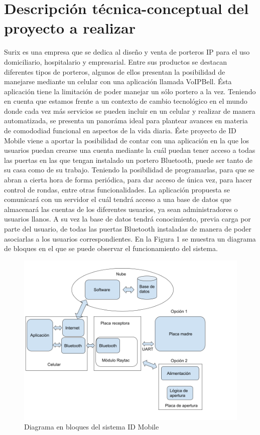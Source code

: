 \documentclass[11pt]{charter}
\begin{document}
\section{Descripción técnica-conceptual del proyecto a realizar}
\label{sec:descripcion}

Surix es una empresa que se dedica al diseño y venta de porteros IP para el uso domiciliario, hospitalario y empresarial. 
Entre sus productos se destacan diferentes tipos de porteros, algunos de ellos presentan la posibilidad de manejarse mediante un celular con una aplicación llamada VoIPBell. Ésta aplicación tiene la limitación de poder manejar un sólo portero a la vez. \newline
Teniendo en cuenta que estamos frente a un contexto de cambio tecnológico en el mundo donde cada vez más servicios se pueden incluir en un celular y realizar de manera automatizada, se presenta un panoráma ideal para plantear avances en materia de comododiad funcional en aspectos de la vida diaria. \newline
Éste proyecto de ID Mobile viene a aportar la posibilidad de contar con una aplicación en la que los usuarios puedan crearse una cuenta mediante la cuál puedan tener acceso a todas las puertas en las que tengan instalado un portero Bluetooth, puede ser tanto de su casa como de su trabajo. Teniendo la posibilidad de programarlas, para que se abran a cierta hora de forma periódica, para dar acceso de única vez, para hacer control de rondas, entre otras funcionalidades. La aplicación propuesta se comunicará con un servidor el cuál tendrá acceso a una base de datos que almacenará las cuentas de los diferentes usuarios, ya sean administradores o usuarios llanos. A su vez la base de datos tendrá conocimiento, previa carga por parte del usuario, de todas las puertas Bluetooth instaladas de manera de poder asociarlas a los usuarios correspondientes. En la Figura 1 se muestra un diagrama de bloques en el que se puede observar el funcionamiento del sistema. 

\vspace{25px}

\begin{figure}[htpb]
\centering 
\includegraphics[width=.9\textwidth]{./Figuras/Diagramadebloques_planificacion.png}
\caption{Diagrama en bloques del sistema ID Mobile}
\label{fig:diagBloques}
\end{figure}
\end{document}
